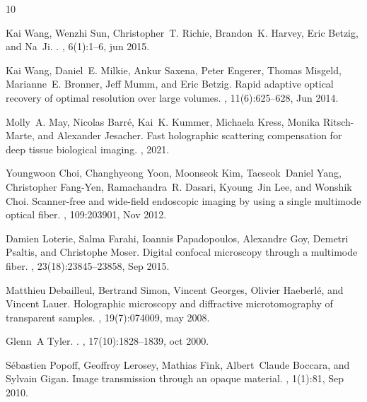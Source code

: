 \documentclass[10pt,twocolumn,twoside,letterpaper]{article}
\begin{document}
\providecommand{\noopsort}[1]{}\providecommand{\singleletter}[1]{#1}%
\begin{thebibliography}{10}

Kai Wang, Wenzhi Sun, Christopher~T. Richie, Brandon~K. Harvey, Eric Betzig,
  and Na~Ji.
.
, 6(1):1--6, jun 2015.

Kai Wang, Daniel~E. Milkie, Ankur Saxena, Peter Engerer, Thomas Misgeld,
  Marianne~E. Bronner, Jeff Mumm, and Eric Betzig.
\newblock Rapid adaptive optical recovery of optimal resolution over large
  volumes.
, 11(6):625--628, Jun 2014.

Molly~A. May, Nicolas Barr{\'e}, Kai~K. Kummer, Michaela Kress, Monika
  Ritsch-Marte, and Alexander Jesacher.
\newblock Fast holographic scattering compensation for deep tissue biological
  imaging.
, 2021.

Youngwoon Choi, Changhyeong Yoon, Moonseok Kim, Taeseok~Daniel Yang,
  Christopher Fang-Yen, Ramachandra~R. Dasari, Kyoung~Jin Lee, and Wonshik
  Choi.
\newblock Scanner-free and wide-field endoscopic imaging by using a single
  multimode optical fiber.
, 109:203901, Nov 2012.

Damien Loterie, Salma Farahi, Ioannis Papadopoulos, Alexandre Goy, Demetri
  Psaltis, and Christophe Moser.
\newblock Digital confocal microscopy through a multimode fiber.
, 23(18):23845--23858, Sep 2015.

Matthieu Debailleul, Bertrand Simon, Vincent Georges, Olivier Haeberl{\'{e}},
  and Vincent Lauer.
\newblock Holographic microscopy and diffractive microtomography of transparent
  samples.
, 19(7):074009, may 2008.

Glenn~A Tyler.
.
, 17(10):1828--1839, oct 2000.

S{\'e}bastien Popoff, Geoffroy Lerosey, Mathias Fink, Albert~Claude Boccara,
  and Sylvain Gigan.
\newblock Image transmission through an opaque material.
, 1(1):81, Sep 2010.


\end{thebibliography}
\end{document}
